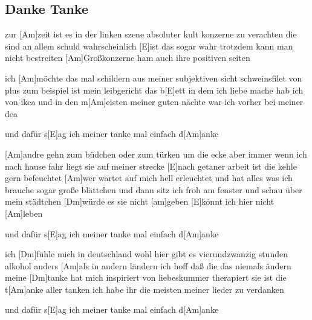 \subsection*{Danke Tanke   }
\begin{guitar}
zur [Am]zeit ist es in der linken szene absoluter kult
konzerne zu verachten die sind an allem schuld
wahrscheinlich [E]ist das sogar wahr trotzdem kann man nicht bestreiten
[Am]Großkonzerne ham auch ihre positiven seiten

ich [Am]möchte das mal schildern aus meiner subjektiven sicht
schweinsfilet von plus zum beispiel ist mein leibgericht
das b[E]ett in dem ich liebe mache hab ich von ikea
und in den m[Am]eisten meiner guten nächte war ich vorher bei meiner dea



und dafür s[E]ag ich meiner tanke
mal einfach d[Am]anke



[Am]andre gehn zum büdchen oder zum türken um die ecke
aber immer wenn ich nach hause fahr liegt sie auf meiner strecke
[E]nach getaner arbeit ist die kehle gern befeuchtet
[Am]wer wartet auf mich hell erleuchtet
und hat alles was ich brauche sogar große blättchen
und dann sitz ich froh am fenster und schau über mein städtchen
[Dm]würde es sie nicht [am]geben
[E]könnt ich hier nicht [Am]leben



und dafür s[E]ag ich meiner tanke
mal einfach d[Am]anke



ich [Dm]fühle mich in deutschland wohl
hier gibt es vierundzwanzig stunden alkohol
anders [Am]als in andern ländern
ich hoff daß die das niemals ändern
meine [Dm]tanke hat mich inspiriert
von liebeskummer therapiert
sie ist die t[Am]anke aller tanken
ich habe ihr die meisten meiner lieder zu verdanken



und dafür s[E]ag ich meiner tanke
mal einfach d[Am]anke 
\end{guitar}
